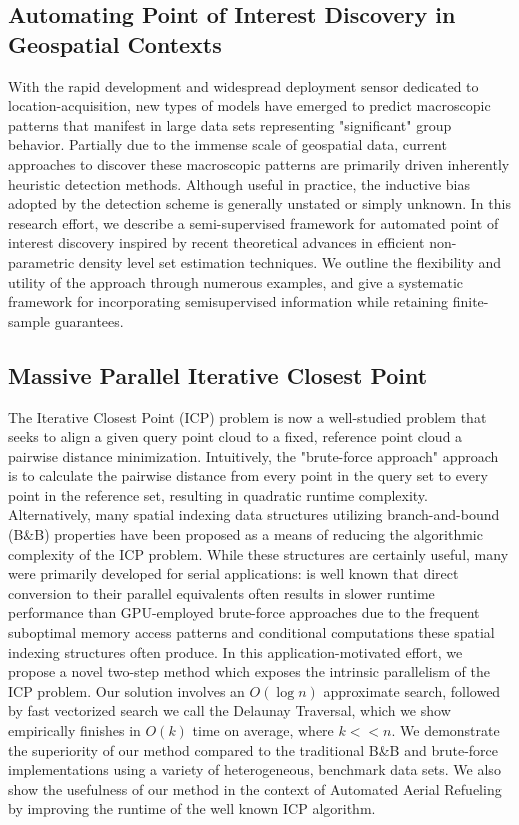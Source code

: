 \documentclass[11pt]{article}
\begin{document}
\subsection{Automating Point of Interest Discovery in Geospatial Contexts}
With the rapid development and widespread deployment sensor dedicated to location-acquisition, new types of models have emerged to predict macroscopic patterns that manifest in large data sets representing "significant" group behavior. Partially due to the immense scale of geospatial data, current approaches to discover these macroscopic patterns are primarily driven inherently heuristic detection methods. Although useful in practice, the inductive bias adopted by the detection scheme is generally unstated or simply unknown. In this research effort, we describe a semi-supervised framework for automated point of interest discovery inspired by recent theoretical advances in efficient non-parametric density level set estimation techniques. We outline the flexibility and utility of the approach through numerous examples, and give a systematic framework for incorporating semisupervised information while retaining finite-sample guarantees.

\subsection{Massive Parallel Iterative Closest Point}
The Iterative Closest Point (ICP) problem is now a well-studied problem that seeks to align a given query point cloud to a fixed, reference point cloud a pairwise distance minimization. Intuitively, the "brute-force approach" approach is to calculate the pairwise distance from every point in the query set to every point in the reference set, resulting in quadratic runtime complexity. Alternatively, many spatial indexing data structures utilizing branch-and-bound (B\&B) properties have been proposed as a means of reducing the algorithmic complexity of the ICP problem. While these structures are certainly useful, many were primarily developed for serial applications: is well known that direct conversion to their parallel equivalents often results in slower runtime performance than GPU-employed brute-force approaches due to the frequent suboptimal memory access patterns and conditional computations these spatial indexing structures often produce. In this application-motivated effort, we propose a novel two-step method which exposes the intrinsic parallelism of the ICP problem. Our solution involves an $O(\log n)$ approximate search, followed by fast vectorized search we call the Delaunay Traversal, which we show empirically finishes in $O(k)$ time on average, where $k << n$. We demonstrate the superiority of our method compared to the traditional B\&B and brute-force implementations using a variety of heterogeneous, benchmark data sets. We also show the usefulness of our method in the context of Automated Aerial Refueling by improving the runtime of the well known ICP algorithm.
\end{document}
